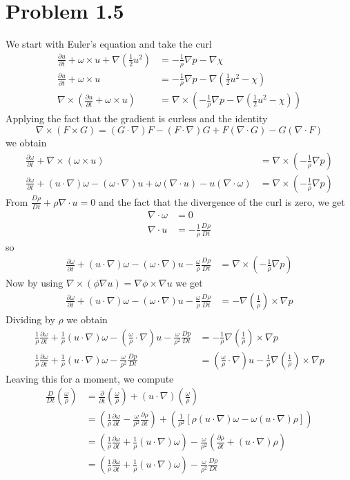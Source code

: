 \documentclass[12pt]{article}
\newcommand{\eq}[1]{\begin{align*}#1\end{align*}}
\newcommand{\p}[2]{\frac{\partial#1}{\partial#2}}
\begin{document}
\section*{Problem 1.5}
We start with Euler's equation and take the curl
\eq{
	\p{u}{t} + \omega\times u + \nabla(\frac{1}{2}u^2) &= -\frac{1}{\rho}\nabla p - \nabla \chi\\
	\p{u}{t} + \omega\times u &= -\frac{1}{\rho}\nabla p - \nabla(\frac{1}{2}u^2 - \chi)\\
	\nabla\times\left(\p{u}{t} + \omega\times u\right) &= \nabla\times\left(-\frac{1}{\rho}\nabla p - \nabla(\frac{1}{2}u^2 - \chi)\right)
}
Applying the fact that the gradient is curless and the identity $$\nabla \times (F \times G) = (G\cdot\nabla)F - (F\cdot\nabla)G + F(\nabla \cdot G) - G(\nabla\cdot F)$$ we obtain
\eq{
	\p{\omega}{t} + \nabla\times(\omega\times u) &= \nabla\times\left(-\frac{1}{\rho}\nabla p\right)\\
	\p{\omega}{t} + (u\cdot\nabla)\omega - (\omega\cdot\nabla)u + \omega(\nabla\cdot u) - u(\nabla\cdot\omega) &= \nabla\times\left(-\frac{1}{\rho}\nabla p\right)
}
From $\frac{D\rho}{Dt} + \rho\nabla\cdot u = 0$ and the fact that the divergence of the curl is zero, we get
\eq{
	\nabla\cdot\omega &= 0\\
	\nabla\cdot u &= -\frac{1}{\rho}\frac{D\rho}{Dt}
}
so
\eq{
	\p{\omega}{t} + (u\cdot\nabla)\omega - (\omega\cdot\nabla)u - \frac{\omega}{\rho}\frac{D\rho}{Dt} &= \nabla\times\left(-\frac{1}{\rho}\nabla p\right)
}
Now by using $\nabla\times(\phi\nabla u) = \nabla\phi \times \nabla u$ we get
\eq{
	\p{\omega}{t} + (u\cdot\nabla)\omega - (\omega\cdot\nabla)u - \frac{\omega}{\rho}\frac{D\rho}{Dt} &= -\nabla(\frac{1}{\rho})\times \nabla p
}
Dividing by $\rho$ we obtain
\eq{
	\frac{1}{\rho}\p{\omega}{t} + \frac{1}{\rho}(u\cdot\nabla)\omega - (\frac{\omega}{\rho}\cdot\nabla)u - \frac{\omega}{\rho^2}\frac{Dp}{Dt} &= -\frac{1}{\rho}\nabla(\frac{1}{\rho})\times\nabla p\\
	\frac{1}{\rho}\p{\omega}{t} + \frac{1}{\rho}(u\cdot\nabla)\omega - \frac{\omega}{\rho^2}\frac{Dp}{Dt} &= (\frac{\omega}{\rho}\cdot\nabla)u -\frac{1}{\rho}\nabla(\frac{1}{\rho})\times\nabla p
}
Leaving this for a moment, we compute
\eq{
	\frac{D}{Dt}(\frac{\omega}{\rho}) &= \p{}{t}(\frac{\omega}{\rho}) + (u\cdot\nabla)(\frac{\omega}{\rho})\\
	&= (\frac{1}{\rho}\p{\omega}{t} - \frac{\omega}{\rho^2}\p{\rho}{t}) + (\frac{1}{\rho^2}\left[\rho(u\cdot\nabla)\omega - \omega(u\cdot\nabla)\rho\right])\\
	&= (\frac{1}{\rho}\p{\omega}{t} + \frac{1}{\rho}(u\cdot\nabla)\omega) - \frac{\omega}{\rho^2}(\p{\rho}{t} + (u\cdot\nabla)\rho)\\
	&= (\frac{1}{\rho}\p{\omega}{t} + \frac{1}{\rho}(u\cdot\nabla)\omega) - \frac{\omega}{\rho^2}\frac{D\rho}{Dt}
}
\end{document}
